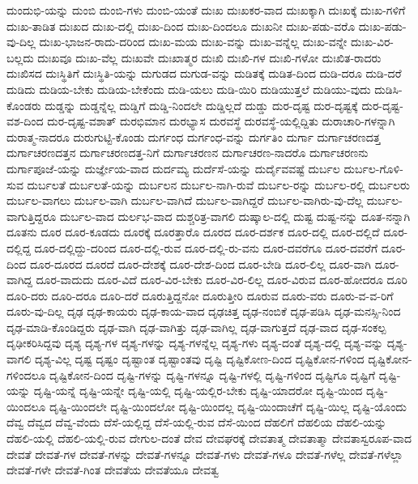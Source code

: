 {ದುಂದುಭಿ-ಯನ್ನು
ದುಂಬಿ
ದುಂಬಿ-ಗಳು
ದುಂಬಿ-ಯಂತೆ
ದುಃಖ
ದುಃಖಕರ-ವಾದ
ದುಃಖಕ್ಕಾಗಿ
ದುಃಖಕ್ಕೆ
ದುಃಖ-ಗಳಿಗೆ
ದುಃಖ-ತಾಡಿತ
ದುಃಖದ
ದುಃಖ-ದಲ್ಲಿ
ದುಃಖ-ದಿಂದ
ದುಃಖ-ದಿಂದಲೂ
ದುಃಖನೀ
ದುಃಖ-ಪಡು-ವರೊ
ದುಃಖ-ಪಡು-ವು-ದಿಲ್ಲ
ದುಃಖ-ಭಾಜನ-ರಾದು-ದರಿಂದ
ದುಃಖ-ಮಯ
ದುಃಖ-ವನ್ನು
ದುಃಖ-ವನ್ನೆಲ್ಲ
ದುಃಖ-ವನ್ನೇ
ದುಃಖ-ವಿರ-ಬಲ್ಲದು
ದುಃಖವೂ
ದುಃಖ-ವೆಲ್ಲ
ದುಃಖವೇ
ದುಃಖಾತ್ಮರ
ದುಃಖಿ
ದುಃಖಿ-ಗಳ
ದುಃಖಿ-ಗಳೋ
ದುಃಖಿತ-ರಾದರು
ದುಃಖಿಸದ
ದುಃಸ್ಥಿತಿಗೆ
ದುಃಸ್ಥಿತಿ-ಯನ್ನು
ದುಗುಡದ
ದುಗುಡ-ವನ್ನು
ದುಡಿತಕ್ಕೆ
ದುಡಿತ-ದಿಂದ
ದುಡಿ-ದರೂ
ದುಡಿ-ದರೆ
ದುಡಿದು
ದುಡಿಯ-ಬೇಕು
ದುಡಿಯ-ಬೇಕೆಂದು
ದುಡಿ-ಯಲು
ದುಡಿ-ಯಿರಿ
ದುಡಿಯುತ್ತಲೆ
ದುಡಿಯು-ವುದು
ದುಡಿಸಿ-ಕೊಂಡರು
ದುಡ್ಡನ್ನು
ದುಡ್ಡನ್ನೆಲ್ಲ
ದುಡ್ಡಿಗೆ
ದುಡ್ಡಿ-ನಿಂದಲೇ
ದುಡ್ಡಿಲ್ಲದೆ
ದುಡ್ಡು
ದುರ-ದೃಷ್ಟ
ದುರ-ದೃಷ್ಟಕ್ಕೆ
ದುರ-ದೃಷ್ಟ-ವಶ-ದಿಂದ
ದುರ-ದೃಷ್ಟ-ವಶಾತ್
ದುರಭಿಮಾನ
ದುರಭ್ಯಾಸ
ದುರವಸ್ಥೆ
ದುರವಸ್ಥೆ-ಯಲ್ಲಿದ್ದಿತು
ದುರಾಚಾರಿ-ಗಳನ್ನಾಗಿ
ದುರಾತ್ಮ-ನಾದರೂ
ದುರುಗುಟ್ಟಿ-ಕೊಂಡು
ದುರ್ಗಂಧ
ದುರ್ಗಂಧ-ವನ್ನು
ದುರ್ಗತಿಂ
ದುರ್ಗಾ
ದುರ್ಗಾಚರಣದತ್ತ
ದುರ್ಗಾಚರಣದತ್ತನ
ದುರ್ಗಾಚರಣದತ್ತ-ನಿಗೆ
ದುರ್ಗಾಚರಣನ
ದುರ್ಗಾಚರಣ-ನಾದರೊ
ದುರ್ಗಾಚರಣನು
ದುರ್ಗಾಪೂಜೆ-ಯನ್ನು
ದುರ್ಜ್ಞೇಯ-ವಾದ
ದುರ್ದಮ್ಯ
ದುರ್ದೆಸೆ-ಯನ್ನು
ದುರ್ದೈವವಷ್ಟೆ
ದುರ್ಬಲ
ದುರ್ಬಲ-ಗೊಳಿ-ಸುವ
ದುರ್ಬಲತೆ
ದುರ್ಬಲತೆ-ಯನ್ನು
ದುರ್ಬಲನ
ದುರ್ಬಲ-ನಾಗಿ-ರುವೆ
ದುರ್ಬಲ-ರನ್ನು
ದುರ್ಬಲ-ರಲ್ಲಿ
ದುರ್ಬಲರು
ದುರ್ಬಲ-ವಾಗಲು
ದುರ್ಬಲ-ವಾಗಿ
ದುರ್ಬಲ-ವಾಗಿದೆ
ದುರ್ಬಲ-ವಾಗಿದ್ದರೆ
ದುರ್ಬಲ-ವಾಗಿರು-ವು-ದೆಲ್ಲ
ದುರ್ಬಲ-ವಾಗುತ್ತಿದ್ದರೂ
ದುರ್ಬಲ-ವಾದ
ದುರ್ಲಭ-ವಾದ
ದುಶ್ಚರಿತ್ರ-ವಾಗಲಿ
ದುಷ್ಕಾಲ-ದಲ್ಲಿ
ದುಷ್ಟ
ದುಷ್ಟ-ನನ್ನು
ದೂತ-ನನ್ನಾಗಿ
ದೂತನು
ದೂರ
ದೂರ-ಕೂಡದು
ದೂರಕ್ಕೆ
ದೂರತ್ತಾರೊ
ದೂರದ
ದೂರ-ದರ್ಶಕ
ದೂರ-ದಲ್ಲಿ
ದೂರ-ದಲ್ಲಿದೆ
ದೂರ-ದಲ್ಲಿದ್ದ
ದೂರ-ದಲ್ಲಿದ್ದು-ದರಿಂದ
ದೂರ-ದಲ್ಲಿ-ರುವ
ದೂರ-ದಲ್ಲಿ-ರು-ವನು
ದೂರ-ದವರೆಗೂ
ದೂರ-ದವರೆಗೆ
ದೂರ-ದಿಂದ
ದೂರ-ದೂರದ
ದೂರದೆ
ದೂರ-ದೇಶಕ್ಕೆ
ದೂರ-ದೇಶ-ದಿಂದ
ದೂರ-ಬೇಡಿ
ದೂರ-ಲಿಲ್ಲ
ದೂರ-ವಾಗಿ
ದೂರ-ವಾಗಿದ್ದ
ದೂರ-ವಾದುದು
ದೂರ-ವಿದೆ
ದೂರ-ವಿರ-ಬೇಕು
ದೂರ-ವಿರ-ಲಿಲ್ಲ
ದೂರ-ವಿರುವ
ದೂರ-ಹೋದರೂ
ದೂರಿ
ದೂರಿ-ದರು
ದೂರಿ-ದರೂ
ದೂರಿ-ದರೆ
ದೂರುತ್ತಿದ್ದನೋ
ದೂರುತ್ತೀರಿ
ದೂರುವ
ದೂರು-ವರು
ದೂರು-ವ-ವ-ರಿಗೆ
ದೂರು-ವು-ದಿಲ್ಲ
ದೃಢ
ದೃಢ-ಕಾಯರು
ದೃಢ-ಕಾಯ-ವಾದ
ದೃಢಚಿತ್ತ
ದೃಢ-ನಂಬಿಕೆ
ದೃಢ-ಪಡಿಸಿ
ದೃಢ-ಮನಸ್ಸಿ-ನಿಂದ
ದೃಢ-ಮಾಡಿ-ಕೊಂಡಿದ್ದರು
ದೃಢ-ವಾಗಿ
ದೃಢ-ವಾಗಿತ್ತು
ದೃಢ-ವಾಗಿಲ್ಲ
ದೃಢ-ವಾಗುತ್ತದೆ
ದೃಢ-ವಾದ
ದೃಢ-ಸಂಕಲ್ಪ
ದೃಢೀಕರಿಸಿದ್ದವು
ದೃಶ್ಯ
ದೃಶ್ಯ-ಗಳ
ದೃಶ್ಯ-ಗಳನ್ನು
ದೃಶ್ಯ-ಗಳನ್ನೆಲ್ಲ
ದೃಶ್ಯ-ಗಳು
ದೃಶ್ಯ-ದಂತೆ
ದೃಶ್ಯ-ದಲ್ಲಿ
ದೃಶ್ಯ-ವನ್ನು
ದೃಶ್ಯ-ವಾಗಲಿ
ದೃಶ್ಯ-ವಿಲ್ಲ
ದೃಷ್ಟ
ದೃಷ್ಟಂ
ದೃಷ್ಟಾಂತ
ದೃಷ್ಟಾಂತವು
ದೃಷ್ಟಿ
ದೃಷ್ಟಿಕೋಣ-ದಿಂದ
ದೃಷ್ಟಿಕೋನ-ಗಳಿಂದ
ದೃಷ್ಟಿಕೋನ-ಗಳಿಂದಲೂ
ದೃಷ್ಟಿಕೋನ-ದಿಂದ
ದೃಷ್ಟಿ-ಗಳನ್ನು
ದೃಷ್ಟಿ-ಗಳನ್ನೂ
ದೃಷ್ಟಿ-ಗಳಲ್ಲಿ
ದೃಷ್ಟಿ-ಗಳಿಂದ
ದೃಷ್ಟಿಗೂ
ದೃಷ್ಟಿಗೆ
ದೃಷ್ಟಿ-ಯನ್ನು
ದೃಷ್ಟಿ-ಯನ್ನೆ
ದೃಷ್ಟಿ-ಯನ್ನೇ
ದೃಷ್ಟಿ-ಯಲ್ಲಿ
ದೃಷ್ಟಿ-ಯಲ್ಲಿರ-ಬೇಕು
ದೃಷ್ಟಿ-ಯಾದರೋ
ದೃಷ್ಟಿ-ಯಿಂದ
ದೃಷ್ಟಿ-ಯಿಂದಲೂ
ದೃಷ್ಟಿ-ಯಿಂದಲೇ
ದೃಷ್ಟಿ-ಯಿಂದಲೋ
ದೃಷ್ಟಿ-ಯಿಂದಲ್ಲ
ದೃಷ್ಟಿ-ಯಿಂದಾಚೆಗೆ
ದೃಷ್ಟಿ-ಯಿಲ್ಲ
ದೃಷ್ಟಿ-ಯೊಂದು
ದೆವ್ವ
ದೆವ್ವದ
ದೆವ್ವ-ವೆಂದು
ದೆಸೆ-ಯಲ್ಲಿದ್ದ
ದೆಸೆ-ಯಲ್ಲಿ-ರುವ
ದೆಸೆ-ಯಿಂದ
ದೆಹಲಿಗೆ
ದೆಹಲಿಯ
ದೆಹಲಿ-ಯನ್ನು
ದೆಹಲಿ-ಯಲ್ಲಿ
ದೆಹಲಿ-ಯಲ್ಲಿ-ರುವ
ದೇಗುಲ-ದಂತೆ
ದೇವ
ದೇವಘರಕ್ಕೆ
ದೇವತಾತ್ಮ
ದೇವತಾತ್ಮಾ
ದೇವತಾಸ್ವರೂಪ-ವಾದ
ದೇವತೆ
ದೇವತೆ-ಗಳ
ದೇವತೆ-ಗಳನ್ನು
ದೇವತೆ-ಗಳನ್ನೂ
ದೇವತೆ-ಗಳು
ದೇವತೆ-ಗಳೂ
ದೇವತೆ-ಗಳೆಲ್ಲ
ದೇವತೆ-ಗಳೆಲ್ಲಾ
ದೇವತೆ-ಗಳೇ
ದೇವತೆ-ಗಿಂತ
ದೇವತೆಯ
ದೇವತೆಯೂ
ದೇವತ್ವ
}
